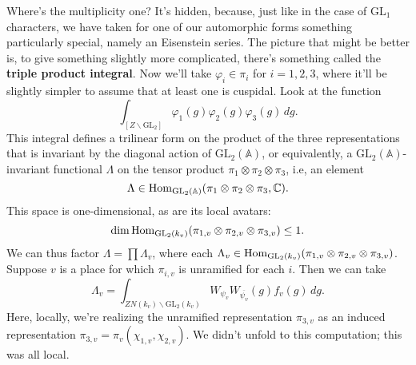 \documentclass[reqno]{amsart} 
\numberwithin{theorem}{section}
\numberwithin{equation}{section}
\numberwithin{exercise}{section}
\begin{document}
Where's the multiplicity one?  It's hidden, because, just like in the case of $\mathrm{GL}_1$ characters, we have taken for one of our automorphic forms something particularly special, namely an Eisenstein series.  The picture that might be better is, to give something slightly more complicated, there's something called the \textbf{triple product integral}.  Now we'll take $\varphi_i \in \pi_i$ for $i = 1, 2, 3$, where it'll be slightly simpler to assume that at least one is cuspidal.  Look at the function
\begin{equation*}
  \int_{[Z \backslash \mathrm{GL}_2]}
  \varphi_1(g) \varphi_2(g) \varphi_3(g) \, d g.
\end{equation*}
This integral defines a trilinear form on the product of the three representations that is invariant by the diagonal action of $\mathrm{GL}_2(\mathbb{A})$, or equivalently, a $\mathrm{GL}_2(\mathbb{A})$-invariant functional $\Lambda$ on the tensor product $\pi_1 \otimes \pi_2 \otimes \pi_3$, i.e, an element
\begin{equation*}
  \Lambda \in \operatorname{Hom}_{\mathrm{GL}_2(\mathbb{A})}(\pi_1 \otimes \pi_2 \otimes \pi_3, \mathbb{C}).
\end{equation*}
This space is one-dimensional, as are its local avatars:
\begin{equation*}
  \dim \operatorname{Hom}_{\mathrm{GL}_2(k_v)}(\pi_{1, v} \otimes \pi_{2, v} \otimes \pi_{3, v}) \leq 1.
\end{equation*}
We can thus factor $\Lambda = \prod \Lambda_v$, where each $\Lambda_v \in \operatorname{Hom}_{\mathrm{GL}_2(k_v)}(\pi_{1, v} \otimes \pi_{2, v} \otimes \pi_{3, v})$.  Suppose $v$ is a place for which $\pi_{i, v}$ is unramified for each $i$.  Then we can take
\begin{equation*}
  \Lambda_v =
  \int_{Z N(k_v) \backslash \mathrm{GL}_2(k_v)}
  W_{\psi_v} W_{\overline{\psi_v}}(g) f_v(g) \, d g.
\end{equation*}
Here, locally, we're realizing the unramified representation $\pi_{3, v}$ as an induced representation $\pi_{3, v} = \pi_v(\chi_{1, v}, \chi_{2, v})$.  We didn't unfold to this computation; this was all local.
\end{document}

